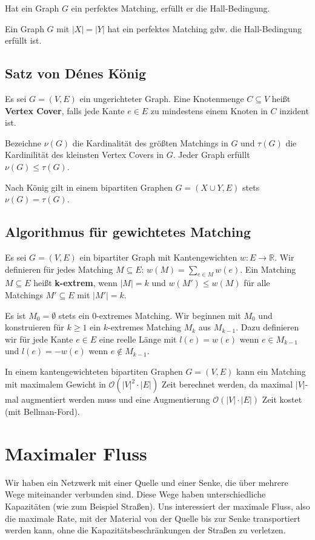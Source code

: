 \documentclass[12pt]{article}
\begin{document}
Hat ein Graph $G$ ein perfektes Matching, erfüllt er die Hall-Bedingung.

Ein Graph $G$ mit $|X| = |Y|$ hat ein perfektes Matching gdw. die Hall-Bedingung erfüllt ist.

\subsection{Satz von Dénes König}

Es sei $G = (V, E)$ ein ungerichteter Graph. Eine Knotenmenge $C \subseteq V$ heißt \textbf{Vertex Cover}, falls jede Kante $e \in E$ zu mindestens einem Knoten in $C$ inzident ist.

Bezeichne $\nu(G)$ die Kardinalität des größten Matchings in $G$ und $\tau(G)$ die Kardinilität des kleinsten Vertex Covers in $G$. Jeder Graph erfüllt $\nu(G) \leq \tau(G)$.

Nach König gilt in einem bipartiten Graphen $G = (X \cup Y, E)$ stets $\nu(G) = \tau(G)$.

\subsection{Algorithmus für gewichtetes Matching}

Es sei $G = (V, E)$ ein bipartiter Graph mit Kantengewichten $w : E \rightarrow \mathbb{R}$. Wir definieren für jedes Matching $M \subseteq E$: $w(M) = \sum_{e \in M} w(e)$. Ein Matching $M \subseteq E$ heißt \textbf{k-extrem}, wenn $|M| = k$ und $w(M') \leq w(M)$ für alle Matchings $M' \subseteq E$ mit $|M'| = k$.

Es ist $M_0 = \emptyset$ stets ein $0$-extremes Matching. Wir beginnen mit $M_0$ und konstruieren für $k \geq 1$ ein $k$-extremes Matching $M_k$ aus $M_{k-1}$. Dazu definieren wir für jede Kante $e \in E$ eine reelle Länge mit $l(e) = w(e)$ wenn $e \in M_{k-1}$ und $l(e) = -w(e)$ wenn $e \notin M_{k-1}$.

In einem kantengewichteten bipartiten Graphen $G = (V, E)$ kann ein Matching mit maximalem Gewicht in $\mathcal O(|V|^2 \cdot |E|)$ Zeit berechnet werden, da maximal $|V|$-mal augmentiert werden muss und eine Augmentierung $\mathcal O(|V|\cdot|E|)$ Zeit kostet (mit Bellman-Ford).

\section{Maximaler Fluss}

Wir haben ein Netzwerk mit einer Quelle und einer Senke, die über mehrere Wege miteinander verbunden sind. Diese Wege haben unterschiedliche Kapazitäten (wie zum Beispiel Straßen). Uns interessiert der maximale Fluss, also die maximale Rate, mit der Material von der Quelle bis zur Senke transportiert werden kann, ohne die Kapazitätsbeschränkungen der Straßen zu verletzen.
\end{document}

